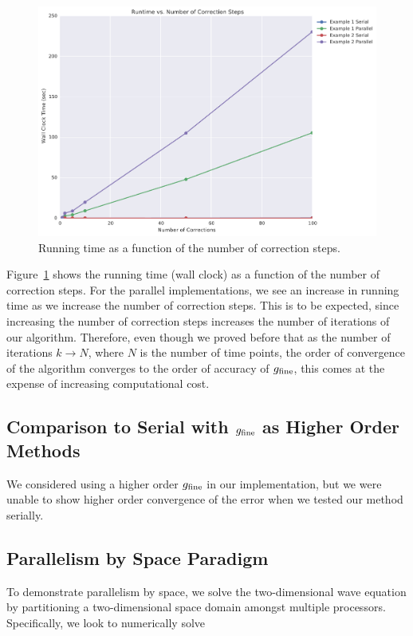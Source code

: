 \documentclass[letterpaper,12pt]{article}
\begin{document}
\begin{figure}[H]
\begin{center}
\includegraphics[width=0.75\linewidth]{data/runtime_vs_corrections.pdf}
\caption{Running time as a function of the number of correction steps.}
\label{fig:run_v_k}
\end{center}
\end{figure}

Figure~\ref{fig:run_v_k} shows the running time (wall clock) as a function of
the number of correction steps. For the parallel implementations, we see an
increase in running time as we increase the number of correction steps. This is
to be expected, since increasing the number of correction steps increases the
number of iterations of our algorithm. Therefore, even though we proved before
that as the number of iterations $k \to N$, where $N$ is the number of time
points, the order of convergence of the algorithm converges to the order of
accuracy of $g_{\textnormal{fine}}$, this comes at the expense of increasing
computational cost. 

\subsection{Comparison to Serial with $g_{\textnormal{fine}}$ as Higher Order
Methods}

We considered using a higher order $g_{\textnormal{fine}}$ in our
implementation, but we were unable to show higher order convergence of the error
when we tested our method serially. 

\subsection{Parallelism by Space Paradigm}

To demonstrate parallelism by space, we solve the two-dimensional wave equation by partitioning a two-dimensional space domain amongst multiple processors. Specifically, we look to numerically solve
\end{document}
